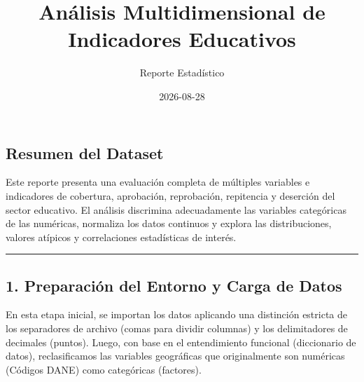 \documentclass[
]{article}
\title{Análisis Multidimensional de Indicadores Educativos}
\author{Reporte Estadístico}
\date{2026-08-28}
\begin{document}
\maketitle

{
\setcounter{tocdepth}{3}
\tableofcontents
}
\subsection{Resumen del Dataset}\label{resumen-del-dataset}

Este reporte presenta una evaluación completa de múltiples variables e
indicadores de cobertura, aprobación, reprobación, repitencia y
deserción del sector educativo. El análisis discrimina adecuadamente las
variables categóricas de las numéricas, normaliza los datos continuos y
explora las distribuciones, valores atípicos y correlaciones
estadísticas de interés.

\begin{center}\rule{0.5\linewidth}{0.5pt}\end{center}

\subsection{1. Preparación del Entorno y Carga de
Datos}\label{preparaciuxf3n-del-entorno-y-carga-de-datos}

En esta etapa inicial, se importan los datos aplicando una distinción
estricta de los separadores de archivo (comas para dividir columnas) y
los delimitadores de decimales (puntos). Luego, con base en el
entendimiento funcional (diccionario de datos), reclasificamos las
variables geográficas que originalmente son numéricas (Códigos DANE)
como categóricas (factores).
\end{document}
